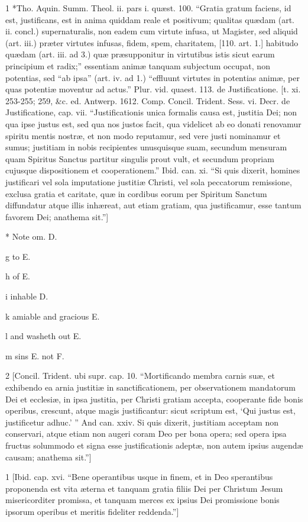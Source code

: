 1
*Tho. Aquin. Summ. Theol. ii. pars i. quæst. 100. “Gratia gratum faciens, id est, justificans, est in anima quiddam reale et positivum; qualitas quædam (art. ii. concl.) supernaturalis, non eadem cum virtute infusa, ut Magister, sed aliquid (art. iii.) præter virtutes infusas, fidem, spem, charitatem, [110. art. 1.] habitudo quædam (art. iii. ad 3.) quæ præsupponitur in virtutibus istis sicut earum principium et radix;” essentiam animæ tanquam subjectum occupat, non potentias, sed “ab ipsa” (art. iv. ad 1.) “effluunt virtutes in potentias animæ, per quas potentiæ moventur ad actus.” Plur. vid. quaest. 113. de Justificatione. [t. xi. 253-255; 259, &c. ed. Antwerp. 1612. Comp. Concil. Trident. Sess. vi. Decr. de Justificatione, cap. vii. “Justificationis unica formalis causa est, justitia Dei; non qua ipse justus est, sed qua nos justos facit, qua videlicet ab eo donati renovamur spiritu mentis nostræ, et non modo reputamur, sed vere justi nominamur et sumus; justitiam in nobis recipientes unusquisque suam, secundum mensuram quam Spiritus Sanctus partitur singulis prout vult, et secundum propriam cujusque dispositionem et cooperationem.” Ibid. can. xi. “Si quis dixerit, homines justificari vel sola imputatione justitiæ Christi, vel sola peccatorum remissione, exclusa gratia et caritate, quæ in cordibus eorum per Spiritum Sanctum diffundatur atque illis inhæreat, aut etiam gratiam, qua justificamur, esse tantum favorem Dei; anathema sit.”]

*
Note om. D.

g
to E.

h
of E.

i
inhable D.

k
amiable and gracious E.

l
and washeth out E.

m
sins E. not F.

2
[Concil. Trident. ubi supr. cap. 10. “Mortificando membra carnis suæ, et exhibendo ea arnia justitiæ in sanctificationem, per observationem mandatorum Dei et ecclesiæ, in ipsa justitia, per Christi gratiam accepta, cooperante fide bonis operibus, crescunt, atque magis justificantur: sicut scriptum est, ‘Qui justus est, justificetur adhuc.’ ” And can. xxiv. Si quis dixerit, justitiam acceptam non conservari, atque etiam non augeri coram Deo per bona opera; sed opera ipsa fructus solummodo et signa esse justificationis adeptæ, non autem ipsius augendæ causam; anathema sit.”]

1
[Ibid. cap. xvi. “Bene operantibus usque in finem, et in Deo sperantibus proponenda est vita æterna et tanquam gratia filiis Dei per Christum Jesum misericorditer promissa, et tanquam merces ex ipsius Dei promissione bonis ipsorum operibus et meritis fideliter reddenda.”]

